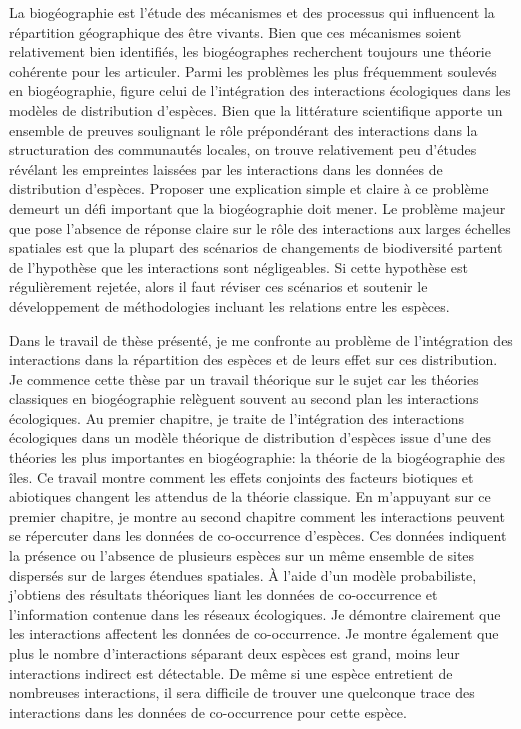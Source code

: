 La biogéographie est l'étude des mécanismes et des processus qui
influencent la répartition géographique des être vivants. Bien que ces
mécanismes soient relativement bien identifiés, les biogéographes
recherchent toujours une théorie cohérente pour les articuler. Parmi les
problèmes les plus fréquemment soulevés en biogéographie, figure celui
de l'intégration des interactions écologiques dans les modèles de
distribution d'espèces. Bien que la littérature scientifique apporte un
ensemble de preuves soulignant le rôle prépondérant des interactions
dans la structuration des communautés locales, on trouve relativement
peu d'études révélant les empreintes laissées par les interactions dans
les données de distribution d'espèces. Proposer une explication simple
et claire à ce problème demeurt un défi important que la biogéographie
doit mener. Le problème majeur que pose l'absence de réponse claire sur
le rôle des interactions aux larges échelles spatiales est que la
plupart des scénarios de changements de biodiversité partent de
l'hypothèse que les interactions sont négligeables. Si cette hypothèse
est régulièrement rejetée, alors il faut réviser ces scénarios et
soutenir le développement de méthodologies incluant les relations entre
les espèces.

Dans le travail de thèse présenté, je me confronte au problème de
l'intégration des interactions dans la répartition des espèces et de
leurs effet sur ces distribution. Je commence cette thèse par un travail
théorique sur le sujet car les théories classiques en biogéographie
relèguent souvent au second plan les interactions écologiques. Au
premier chapitre, je traite de l'intégration des interactions
écologiques dans un modèle théorique de distribution d'espèces issue
d'une des théories les plus importantes en biogéographie: la théorie de
la biogéographie des îles. Ce travail montre comment les effets
conjoints des facteurs biotiques et abiotiques changent les attendus de
la théorie classique. En m'appuyant sur ce premier chapitre, je montre
au second chapitre comment les interactions peuvent se répercuter dans
les données de co-occurrence d'espèces. Ces données indiquent la
présence ou l'absence de plusieurs espèces sur un même ensemble de sites
dispersés sur de larges étendues spatiales. À l'aide d'un modèle
probabiliste, j'obtiens des résultats théoriques liant les données de
co-occurrence et l'information contenue dans les réseaux écologiques. Je
démontre clairement que les interactions affectent les données de
co-occurrence. Je montre également que plus le nombre d'interactions
séparant deux espèces est grand, moins leur interactions indirect est
détectable. De même si une espèce entretient de nombreuses interactions,
il sera difficile de trouver une quelconque trace des interactions dans
les données de co-occurrence pour cette espèce.

